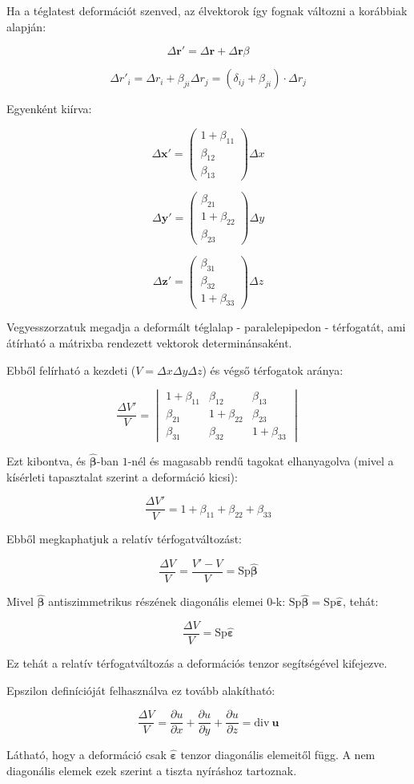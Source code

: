 \documentclass[a4paper, 12pt]{article}
\begin{document}
Ha a téglatest deformációt szenved, az élvektorok így fognak változni a korábbiak alapján:

$$\Delta\mathbf{r'}=\Delta\mathbf{r}+\Delta \mathbf{r} \beta$$

$$\Delta r'_i=\Delta r_i+\beta_{ji}\Delta r_j=(\delta_{ij}+\beta_{ji})\cdot \Delta r_j$$

Egyenként kiírva:

$$\Delta\mathbf{x'}= \left( \begin{array}{c} 1+\beta_{11}\\\beta_{12}\\ \beta_{13}\end{array}\right)\Delta x$$

$$\Delta\mathbf{y'}= \left( \begin{array}{c} \beta_{21}\\1+\beta_{22}\\ \beta_{23}\end{array}\right)\Delta y$$

$$\Delta\mathbf{z'}= \left( \begin{array}{c} \beta_{31}\\\beta_{32}\\ 1+\beta_{33}\end{array}\right)\Delta z$$

Vegyesszorzatuk megadja a deformált téglalap - paralelepipedon - térfogatát, ami átírható a mátrixba rendezett vektorok determinánsaként. 

Ebből felírható a kezdeti ($V=\Delta x\Delta y\Delta z$) és végső térfogatok aránya:

 $$\frac{\Delta V'}{V}=\begin{vmatrix}
1+\beta_{11} & \beta_{12} & \beta_{13} \\ 
\beta_{21} & 1+\beta_{22} & \beta_{23}\\ 
\beta_{31} & \beta_{32} & 1+\beta_{33} 
\end{vmatrix}$$

Ezt kibontva, és $\mathbf{\hat\beta}$-ban $1$-nél és magasabb rendű tagokat elhanyagolva (mivel a kísérleti tapasztalat szerint a deformáció kicsi):

$$\frac{\Delta V'}{V}=1+\beta_{11}+\beta_{22}+\beta_{33}$$

Ebből megkaphatjuk a relatív térfogatváltozást:

$$\frac{\Delta V}{V}=\frac{V'-V}{V}=\mathrm{Sp} \mathbf{\hat\beta}$$

Mivel $\mathbf{\hat\beta}$ antiszimmetrikus részének diagonális elemei $0$-k: $\mathrm{Sp} \mathbf{\hat\beta}=\mathrm{Sp} \mathbf{\hat\varepsilon}$, tehát:

$$\frac{\Delta V}{V}=\mathrm{Sp} \mathbf{\hat\varepsilon}$$

Ez tehát a relatív térfogatváltozás a deformációs tenzor segítségével kifejezve.

Epszilon definícióját felhasználva ez tovább alakítható:

$$\frac{\Delta V}{V}=\frac{\partial u}{\partial x}+\frac{\partial u}{\partial y}+\frac{\partial u}{\partial z}=\mathrm{div}~\mathbf{u}$$

Látható, hogy a deformáció csak $\mathbf{\hat\varepsilon}$ tenzor diagonális elemeitől függ. A nem diagonális elemek ezek szerint a tiszta nyíráshoz tartoznak.
\end{document}
